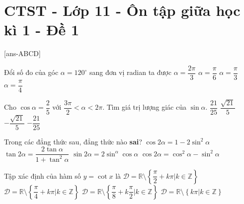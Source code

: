 \section{CTST - Lớp 11 - Ôn tập giữa học kì 1 - Đề 1}

\caulc

[ans-ABCD]

\begin{ex}%
Đổi số đo của góc $\alpha = 120^\circ$ sang đơn vị radian ta được
\choice
{\True $\alpha = \dfrac{2\pi}{3}$}
{$\alpha = \dfrac{\pi}{6}$}
{$\alpha = \dfrac{\pi}{3}$}
{$\alpha = \dfrac{\pi}{4}$}
\end{ex}

\begin{ex}%
Cho $\cos \alpha = \dfrac{2}{5}$ với $\dfrac{3\pi}{2} < \alpha < 2\pi$. Tìm giá trị lượng giác của $\sin \alpha$.
\choice
{$\dfrac{21}{25}$}
{$\dfrac{\sqrt{21}}{5}$}
{\True $-\dfrac{\sqrt{21}}{5}$}
{$-\dfrac{21}{25}$}
\end{ex}

\begin{ex}%
Trong các đẳng thức sau, đẳng thức nào \textbf{sai}?
\choice
{$\cos 2\alpha = 1 - 2 \sin^2 \alpha$}
{\True $\tan 2\alpha = \dfrac{2 \tan \alpha}{1+ \tan^2 \alpha}$}
{$\sin 2\alpha = 2 \sin^ \alpha \cos \alpha$}
{$\cos 2\alpha = \cos^2 \alpha - \sin^2 \alpha$}
\end{ex}

\begin{ex}%
Tập xác định của hàm số $y= \cot x$ là
\choice
{$\mathscr{D}= \mathbb{R} \setminus \left\{ \dfrac{\pi}{2} + k\pi | k \in \mathbb{Z} \right\}$}
{$\mathscr{D}= \mathbb{R} \setminus \left\{ \dfrac{\pi}{4} + k\pi | k \in \mathbb{Z} \right\}$}
{$\mathscr{D}= \mathbb{R} \setminus \left\{ \dfrac{\pi}{8} + k \dfrac{\pi}{2} | k \in \mathbb{Z} \right\}$}
{\True $\mathscr{D}= \mathbb{R} \setminus \left\{k\pi | k \in \mathbb{Z} \right\}$}
\end{ex}

